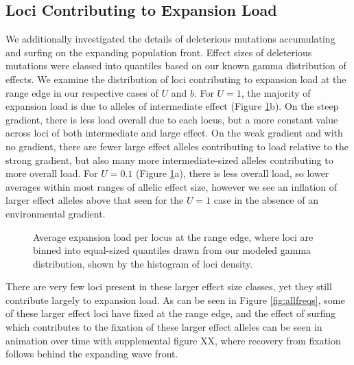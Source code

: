 \subsection{Loci Contributing to Expansion Load}
We additionally investigated the details of deleterious mutations accumulating and surfing on the expanding population front. Effect sizes of deleterious mutations were classed into quantiles based on our known gamma distribution of effects. We examine the distribution of loci contributing to expansion load at the range edge in our respective cases of $U$ and $b$. For $U = 1$, the majority of expansion load is due to alleles of intermediate effect (Figure \ref{fig:loci}b). On the steep gradient, there is less load overall due to each locus, but a more constant value across loci of both intermediate and large effect. On the weak gradient and with no gradient, there are fewer large effect alleles contributing to load relative to the strong gradient, but also many more intermediate-sized alleles contributing to more overall load. For $U = 0.1$ (Figure \ref{fig:loci}a), there is less overall load, so lower averages within most ranges of allelic effect size, however we see an inflation of larger effect alleles  above that seen for the $U= 1$ case in the absence of an environmental gradient.

\begin{figure}[H]
\centering
{}
\caption[Average expansion load per locus.]{Average expansion load per locus at the range edge, where loci are binned into equal-sized quantiles drawn from our modeled gamma distribution, shown by the histogram of loci density.}
\label{fig:loci}
\end{figure}

There are very few loci present in these larger effect size classes, yet they still contribute largely to expansion load. As can be seen in Figure \ref{fig:allfreqs}, some of these larger effect loci have fixed at the range edge, and the effect of surfing which contributes to the fixation of these larger effect alleles can be seen in animation over time with supplemental figure \color{red}XX\color{black}, where recovery from fixation follows behind the expanding wave front.

